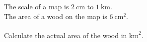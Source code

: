 \question
The scale of a map is $2 \mathrm{~cm}$ to $1 \mathrm{~km}$. \\
The area of a wood on the map is $6 \mathrm{~cm}^2$. \\ \\
Calculate the actual area of the wood in $\mathrm{km}^2$.\\
\vspace{200pt}
{}